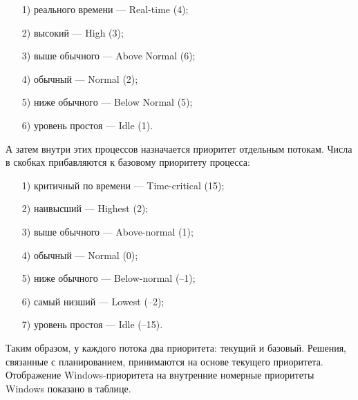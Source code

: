 \documentclass[14pt, a4paper]{extarticle}
\begin{document}
	\begin{itemize}
		\item[1)] реального времени — Real-time (4);
		\item[2)] высокий — High (3);
		\item[3)] выше обычного — Above Normal (6);
		\item[4)] обычный — Normal (2);
		\item[5)]ниже обычного — Below Normal (5);
		\item[6)] уровень простоя — Idle (1).		
	\end{itemize}
	 
	 А затем внутри этих процессов назначается приоритет отдельным потокам. Числа в скобках прибавляются к базовому приоритету процесса:
	 
	 \begin{itemize}
	 	\item[1)] критичный по времени — Time-critical (15);
	 	\item[2)] наивысший — Highest (2);
	 	\item[3)] выше обычного — Above-normal (1);
	 	\item[4)] обычный — Normal (0);
	 	\item[5)] ниже обычного — Below-normal (–1);
	 	\item[6)] самый низший — Lowest (–2);
		\item[7)] уровень простоя — Idle (–15).		
	 \end{itemize}
 
	 Таким образом, у каждого потока два приоритета: текущий и базовый. Решения,
	 связанные с планированием, принимаются на основе текущего приоритета.
	 Отображение Windows-приоритета на внутренние номерные приоритеты Windows
	 показано в таблице. 
	 
\end{document}
